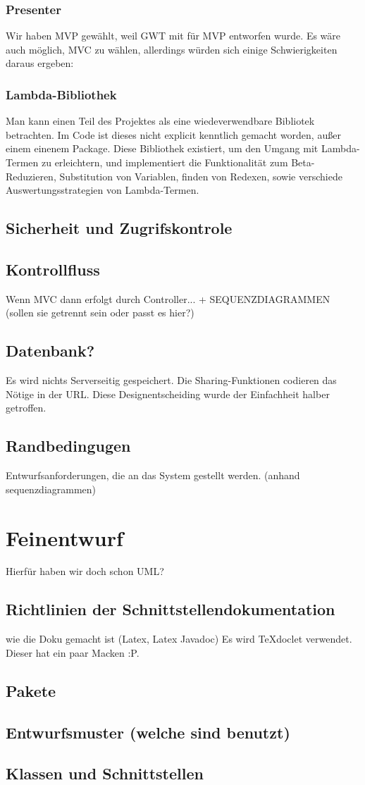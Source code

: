 \documentclass[parskip=full,11pt,twoside]{scrartcl}
\begin{document}
\subsubsection{Presenter}
Wir haben MVP gewählt, weil GWT mit für MVP entworfen wurde. Es wäre auch möglich, MVC zu wählen, allerdings würden sich
einige Schwierigkeiten daraus ergeben: %
\subsubsection{Lambda-Bibliothek}
Man kann einen Teil des Projektes als eine wiedeverwendbare Bibliotek betrachten. Im Code ist dieses nicht
explicit kenntlich gemacht worden, außer einem einenem Package.
Diese Bibliothek existiert, um den Umgang mit Lambda-Termen zu erleichtern, und implementiert die
Funktionalität zum Beta-Reduzieren, Substitution von Variablen, finden von Redexen, sowie verschiede Auswertungsstrategien von Lambda-Termen.


\subsection{Sicherheit und Zugrifskontrole}
\subsection{Kontrollfluss}
Wenn MVC dann erfolgt durch Controller...  + SEQUENZDIAGRAMMEN (sollen sie getrennt sein oder passt es hier?)
\subsection{Datenbank?}
Es wird nichts Serverseitig gespeichert. Die Sharing-Funktionen codieren das Nötige in der URL.
Diese Designentscheiding wurde der Einfachheit halber getroffen.
\subsection{Randbedingugen}
Entwurfsanforderungen, die an das System gestellt werden. (anhand sequenzdiagrammen)
\pagebreak

\section{Feinentwurf}
Hierfür haben wir doch schon UML?
\subsection{Richtlinien der Schnittstellendokumentation}
wie die Doku gemacht ist (Latex, Latex Javadoc)
Es wird TeXdoclet verwendet. Dieser hat ein paar Macken :P.
\subsection{Pakete}
\subsection{Entwurfsmuster (welche sind benutzt)}
\subsection{Klassen und Schnittstellen}
\pagebreak
\end{document}
